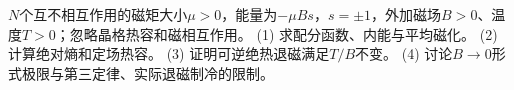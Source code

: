 \(N\)个互不相互作用的磁矩大小\(\mu>0\)，能量为\(-\mu Bs\)，\(s=\pm1\)，外加磁场\(B>0\)、温度\(T>0\)；忽略晶格热容和磁相互作用。
(1) 求配分函数、内能与平均磁化。
(2) 计算绝对熵和定场热容。
(3) 证明可逆绝热退磁满足\(T/B\)不变。
(4) 讨论\(B\to0\)形式极限与第三定律、实际退磁制冷的限制。
